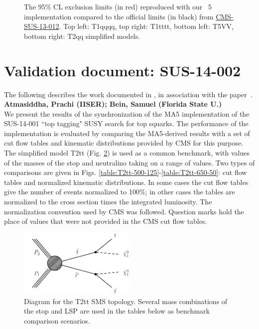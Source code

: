 \begin{figure}
\caption{The 95\% CL exclusion limits (in red) reproduced with our {}~5 implementation compared to the official limits (in black) from \href{https://twiki.cern.ch/twiki/bin/view/CMSPublic/PhysicsResultsSUS13012}{CMS-SUS-13-012}. Top left: T1qqqq, top right: T1tttt, bottom left: T5VV, bottom right: T2qq simplified models.
\label{fig:limitplots}}
        \end{figure} 
\FloatBarrier

\section{Validation document: SUS-14-002}
\label{app:ma5stop}
The following describes the work documented in \cite{MA5-CMS-SUS-14-001}, in association with the paper~\cite{MA5-CMS-SUS-14-001}.
\textbf{Atmasiddha, Prachi (IISER); Bein, Samuel (Florida State U.)}\\
We present the results of the synchronization of the MA5
implementation of the SUS-14-001 ``top tagging" SUSY search for top squarks.  The
performance of the implementation is evaluated by comparing the
MA5-derived results with a set of cut flow tables and kinematic
distributions provided by CMS for this purpose. The simplified model
T2tt (Fig. \ref{fig:T2tt}) is used as a common benchmark, with values of the masses of the
stop and neutralino taking on a range of values. Two types of
comparisons are given in 
Figs. \ref{table:T2tt-500-125}-\ref{table:T2tt-650-50}: cut flow tables and normalized
kinematic distributions. In some cases the
cut flow tables give the number of events normalized to 100\%; in
other cases the tables are normalized to the cross section times the
integrated luminosity. The normalization convention used by CMS was
followed. Question marks hold the place of values that were not
provided in the CMS cut flow tables.
   \begin{figure}
  \centering
    \includegraphics[width=0.5\textwidth]{figures/Appendices/Ma5ValidationSUS13012/T2tt.pdf}
      \caption{Diagram for the T2tt SMS topology. Several mass
        combinations of the stop and LSP are used in the tables below
        as benchmark comparison scenarios.}
      \label{fig:T2tt}
\end{figure}

